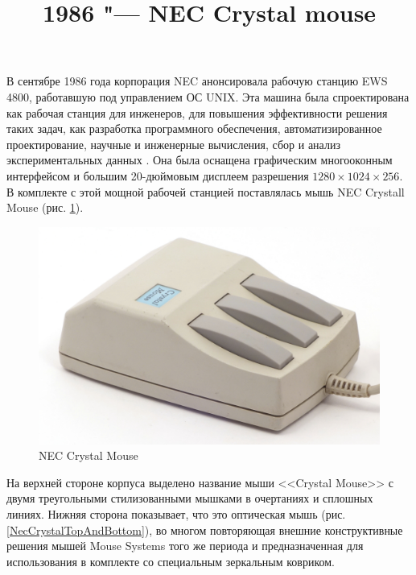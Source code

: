 \documentclass[11pt, a4paper]{article}
\begin{document}
\title{1986 "--- NEC Crystal mouse}
\date{}
\maketitle

В сентябре 1986 года корпорация NEC анонсировала рабочую станцию EWS 4800, работавшую под управлением ОС UNIX. Эта машина была спроектирована как рабочая станция для инженеров, для повышения эффективности решения таких задач, как разработка программного обеспечения, автоматизированное проектирование, научные и инженерные вычисления, сбор и анализ экспериментальных данных \cite{yt}. Она была оснащена графическим многооконным интерфейсом и большим 20-дюймовым дисплеем разрешения $1280 \times 1024 \times 256$. В комплекте с этой мощной рабочей станцией поставлялась мышь NEC Crystall Mouse (рис. \ref{fig:NECCrystalPic}).

\begin{figure}[h]
    \centering
    \includegraphics[scale=0.7]{1986_nec_crystal_mouse/necNorm_30.jpg}
    \caption{NEC Crystal Mouse}
    \label{fig:NECCrystalPic}
\end{figure}

На верхней стороне корпуса выделено название мыши <<Crystal Mouse>> с двумя треугольными стилизованными мышками в очертаниях и сплошных линиях. Нижняя сторона показывает, что это оптическая мышь (рис. \ref{NecCrystalTopAndBottom}), во многом повторяющая внешние конструктивные решения мышей Mouse Systems того же периода и предназначенная для использования в комплекте со специальным зеркальным ковриком.
\end{document}
